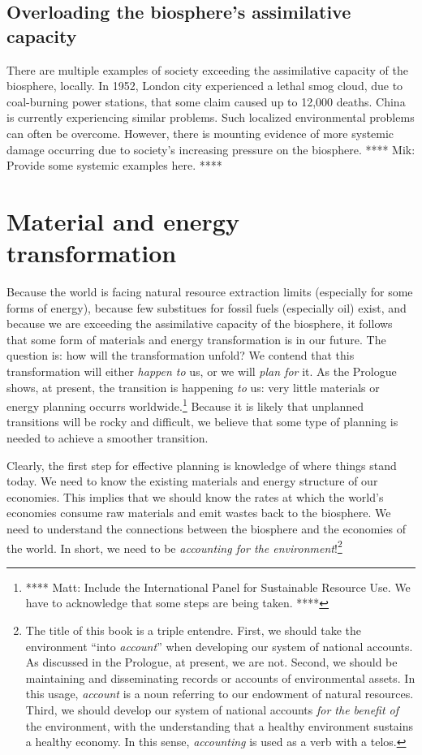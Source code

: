 \subsection{Overloading the biosphere's assimilative capacity}

There are multiple examples of society exceeding 
the assimilative capacity of the biosphere, locally.
In 1952, London city experienced a lethal smog cloud,
due to coal-burning power stations,
that some claim caused up to 12,000 deaths.\cite{Davis2002,Bell2004}
China is currently experiencing similar problems.
Such localized environmental problems can often be overcome. However,
there is mounting evidence of more systemic
damage occurring due to society's increasing pressure on
the biosphere.\cite{MEA2005,Ewing2008}
**** Mik: Provide some systemic examples here. ****


\section{Material and energy transformation}

Because the world is facing natural resource extraction limits
(especially for some forms of energy), 
because few substitues for fossil fuels (especially oil) exist,
and because we are exceeding the assimilative capacity of the biosphere,
it follows that some form of materials and energy transformation is in our future.
The question is: how will the transformation unfold?
We contend that this transformation will either  
\emph{happen to} us, or we will \emph{plan for} it.
As the Prologue shows, at present, the transition is happening \emph{to} us:
very little materials or energy planning occurrs worldwide.\footnote{**** Matt: Include
the International Panel for Sustainable Resource Use. 
We have to acknowledge that some steps are being taken. ****}
Because it is likely that unplanned transitions will be rocky and difficult,
we believe that some type of planning is needed to achieve a smoother transition.

Clearly, the first step for effective planning 
is knowledge of where things stand today.
We need to know the existing materials and energy structure of our economies. 
This implies that we should know the rates at which 
the world's economies consume raw materials and emit wastes back to the biosphere.
We need to understand the connections between the biosphere and the economies of the world.
In short, we need to be \emph{accounting for the environment}!\footnote{The title 
	of this book is a triple entendre.
	First, we should take the environment ``into \emph{account}''
		when developing our system of national accounts.
		As discussed in the Prologue, at present, we are not.
	Second, we should be maintaining and disseminating
		records or accounts of environmental assets. 
		In this usage, \emph{account} is a noun
		referring to our endowment of natural resources.
	Third, we should develop our system of national accounts 
		\emph{for the benefit of} the environment, 
		with the understanding 
		that a healthy environment sustains a healthy economy.
		In this sense, \emph{accounting} is used as a verb with a telos.}

